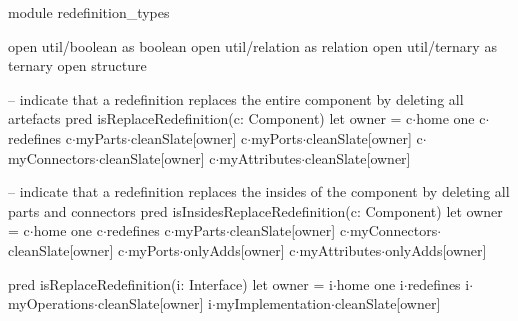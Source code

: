 module redefinition_types

open util/boolean as boolean
open util/relation as relation
open util/ternary as ternary
open structure


-- indicate that a redefinition replaces the entire component by deleting all artefacts
pred isReplaceRedefinition(c: Component)
{
  let owner = c$\cdot$home
  {
    one c$\cdot$redefines
    c$\cdot$myParts$\cdot$cleanSlate[owner]
    c$\cdot$myPorts$\cdot$cleanSlate[owner]
    c$\cdot$myConnectors$\cdot$cleanSlate[owner]
    c$\cdot$myAttributes$\cdot$cleanSlate[owner]
  }
}

-- indicate that a redefinition replaces the insides of the component by deleting all parts and connectors
pred isInsidesReplaceRedefinition(c: Component)
{
  let owner = c$\cdot$home
  {
    one c$\cdot$redefines
    c$\cdot$myParts$\cdot$cleanSlate[owner]
    c$\cdot$myConnectors$\cdot$cleanSlate[owner]
    c$\cdot$myPorts$\cdot$onlyAdds[owner]
    c$\cdot$myAttributes$\cdot$onlyAdds[owner]
  }
}

pred isReplaceRedefinition(i: Interface)
{
  let owner = i$\cdot$home
  {
    one i$\cdot$redefines
    i$\cdot$myOperations$\cdot$cleanSlate[owner]
    i$\cdot$myImplementation$\cdot$cleanSlate[owner]
  }
}
